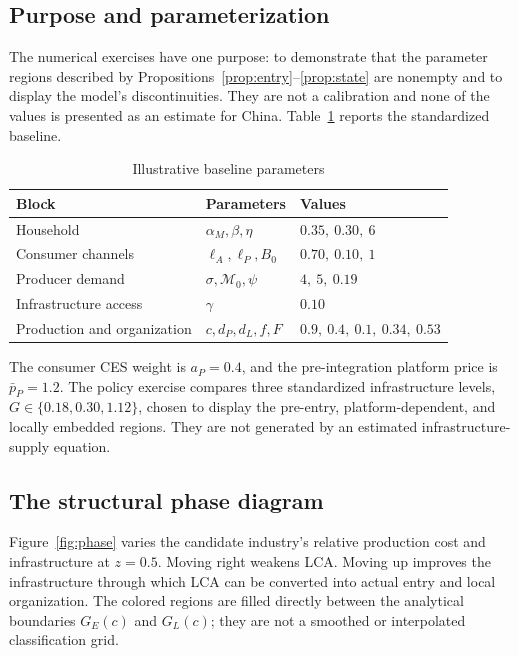 \documentclass[11pt]{article}
\theoremstyle{definition}
\theoremstyle{remark}
\newcommand{\Mcal}{\mathcal M}
\begin{document}
\subsection{Purpose and parameterization}

The numerical exercises have one purpose: to demonstrate that the parameter
regions described by Propositions~\ref{prop:entry}--\ref{prop:state} are
nonempty and to display the model's discontinuities.  They are not a
calibration and none of the values is presented as an estimate for China.
Table~\ref{tab:parameters} reports the standardized baseline.

\begin{table}[htbp]
\centering
\caption{Illustrative baseline parameters}
\label{tab:parameters}
\begin{tabular}{lll}
\toprule
Block & Parameters & Values\\
\midrule
Household
& \(\alpha_M,\beta,\eta\)
& \(0.35,\ 0.30,\ 6\)\\
Consumer channels
& \(\ell_A,\ell_P,B_0\)
& \(0.70,\ 0.10,\ 1\)\\
Producer demand
& \(\sigma,\Mcal_0,\psi\)
& \(4,\ 5,\ 0.19\)\\
Infrastructure access
& \(\gamma\)
& \(0.10\)\\
Production and organization
& \(c,d_P,d_L,f,F\)
& \(0.9,\ 0.4,\ 0.1,\ 0.34,\ 0.53\)\\
\bottomrule
\end{tabular}
\end{table}

The consumer CES weight is \(a_P=0.4\), and the pre-integration platform
price is \(\bar p_P=1.2\).  The policy exercise compares three standardized
infrastructure levels, \(G\in\{0.18,0.30,1.12\}\), chosen to display the
pre-entry, platform-dependent, and locally embedded regions.  They are not
generated by an estimated infrastructure-supply equation.

\subsection{The structural phase diagram}

Figure~\ref{fig:phase} varies the candidate industry's relative production
cost and infrastructure at \(z=0.5\).  Moving right weakens LCA.  Moving up
improves the infrastructure through which LCA can be converted into actual
entry and local organization.  The colored regions are filled directly
between the analytical boundaries \(G_E(c)\) and \(G_L(c)\); they are not a
smoothed or interpolated classification grid.
\end{document}
